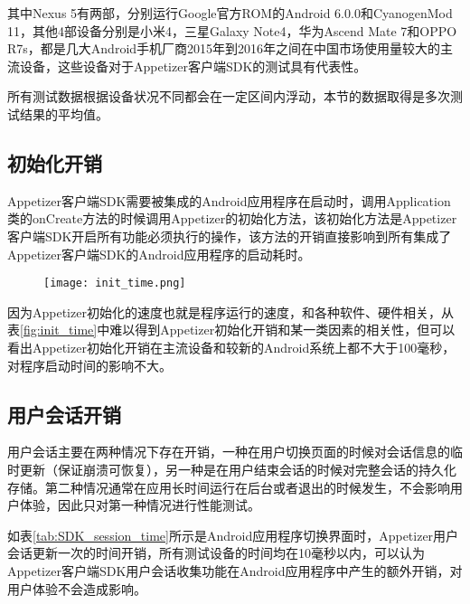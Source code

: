 其中Nexus 5有两部，分别运行Google官方ROM的Android 6.0.0和CyanogenMod 11，其他4部设备分别是小米4，三星Galaxy Note4，华为Ascend Mate 7和OPPO R7s，都是几大Android手机厂商2015年到2016年之间在中国市场使用量较大的主流设备，这些设备对于Appetizer客户端SDK的测试具有代表性。

所有测试数据根据设备状况不同都会在一定区间内浮动，本节的数据取得是多次测试结果的平均值。

\subsection{初始化开销}
\label{subsec:init_cost}

Appetizer客户端SDK需要被集成的Android应用程序在启动时，调用Application类的onCreate方法的时候调用Appetizer的初始化方法，该初始化方法是Appetizer客户端SDK开启所有功能必须执行的操作，该方法的开销直接影响到所有集成了Appetizer客户端SDK的Android应用程序的启动耗时。

\begin{figure}[!htp]
	\centering
	\texttt{[image: init\_time.png]}
\end{figure}

因为Appetizer初始化的速度也就是程序运行的速度，和各种软件、硬件相关，从表\ref{fig:init_time}中难以得到Appetizer初始化开销和某一类因素的相关性，但可以看出Appetizer初始化开销在主流设备和较新的Android系统上都不大于100毫秒，对程序启动时间的影响不大。

\subsection{用户会话开销}
\label{subsec:session_cost}

用户会话主要在两种情况下存在开销，一种在用户切换页面的时候对会话信息的临时更新（保证崩溃可恢复），另一种是在用户结束会话的时候对完整会话的持久化存储。第二种情况通常在应用长时间运行在后台或者退出的时候发生，不会影响用户体验，因此只对第一种情况进行性能测试。

如表\ref{tab:SDK_session_time}所示是Android应用程序切换界面时，Appetizer用户会话更新一次的时间开销，所有测试设备的时间均在10毫秒以内，可以认为Appetizer客户端SDK用户会话收集功能在Android应用程序中产生的额外开销，对用户体验不会造成影响。

